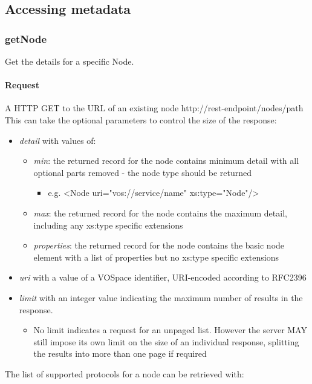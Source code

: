\documentclass[11pt,a4paper]{ivoa}
\begin{document}
\subsection{Accessing metadata}
\label{subsec:accessing metadata}

\subsubsection{getNode}
\label{subsubsec:getnode}
Get the details for a specific Node.

\paragraph{Request}
A HTTP GET to the URL of an existing node http://rest-endpoint/nodes/path
This can take the optional parameters to control the size of the response:

\begin{itemize}
    \item \emph{detail} with values of:
    \begin{itemize}
        \item \emph{min}: the returned record for the node contains minimum detail with all optional parts removed - the node type should be returned
        \begin{itemize}
            \item e.g. <Node uri="vos://service/name" xs:type="Node"/>
        \end{itemize}
        \item \emph{max}: the returned record for the node contains the maximum detail, including any xs:type specific extensions
        \item \emph{properties}: the returned record for the node contains the basic node element with a list of properties but no xs:type specific extensions
    \end{itemize}
    \item \emph{uri} with a value of a VOSpace identifier, URI-encoded according to RFC2396
    \item \emph{limit} with an integer value indicating the maximum number of results in the response.
    \begin{itemize}
        \item No limit indicates a request for an unpaged list. However the server MAY still impose its own limit on the size of an individual response, splitting the results into more than one page if required
     \end{itemize}
\end{itemize}
The list of supported protocols for a node can be retrieved with:
\end{document}
